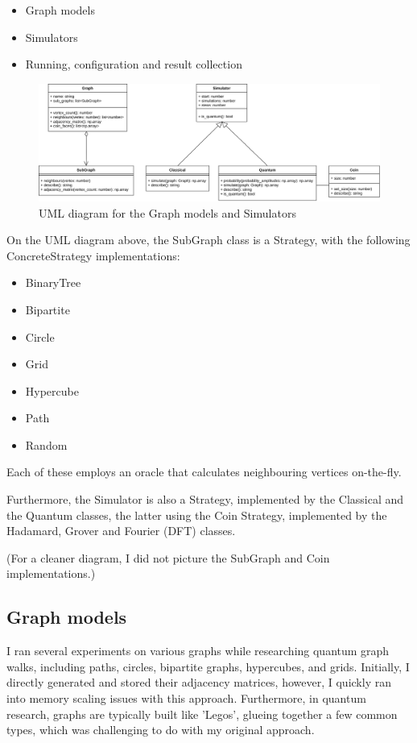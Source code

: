 \begin{itemize}
    \item Graph models
    \item Simulators
    \item Running, configuration and result collection
\end{itemize}

\begin{figure}[H]
  \includegraphics[width=\linewidth]{./figures/program/uml.png}
  \caption{UML diagram for the Graph models and Simulators}
\end{figure}

On the UML diagram above, the SubGraph class is a Strategy, with the following ConcreteStrategy implementations:

\begin{itemize}
    \item BinaryTree
    \item Bipartite
    \item Circle
    \item Grid
    \item Hypercube
    \item Path
    \item Random
\end{itemize}

Each of these employs an oracle that calculates neighbouring vertices on-the-fly.

Furthermore, the Simulator is also a Strategy, implemented by the Classical and the Quantum classes, the latter using the Coin Strategy, implemented by the Hadamard, Grover and Fourier (DFT) classes.

(For a cleaner diagram, I did not picture the SubGraph and Coin implementations.)

\subsection{Graph models}

I ran several experiments on various graphs while researching quantum graph walks, including paths, circles, bipartite graphs, hypercubes, and grids. Initially, I directly generated and stored their adjacency matrices, however, I quickly ran into memory scaling issues with this approach. Furthermore, in quantum research, graphs are typically built like 'Legos', glueing together a few common types, which was challenging to do with my original approach.

